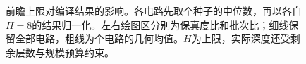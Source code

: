 \begin{figure}[!htb]
  \centering
  \resizebox{\columnwidth}{!}{}
  \caption{前瞻上限对编译结果的影响。各电路先取\HorizonExtSeedN 个种子的中位数，再以各自$H=8$的结果归一化。左右绘图区分别为保真度比和批次比；细线保留全部电路，粗线为\HorizonExtCompleteN 个电路的几何均值。$H$为上限，实际深度还受剩余层数与规模预算约束。}
  \label{fig:experimental-summary}
\end{figure}
